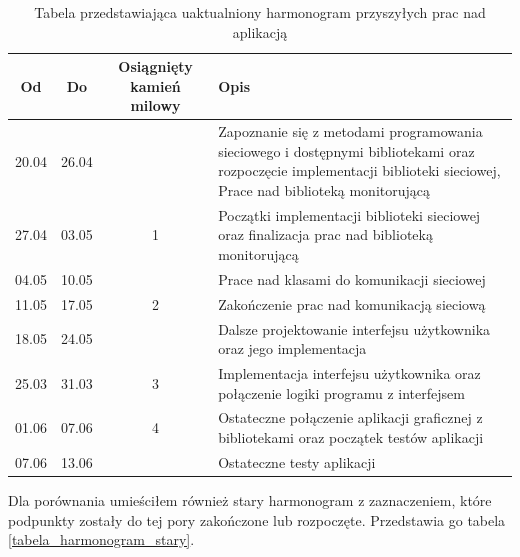 \documentclass[a4paper]{article}
\begin{document}
\begin{table}[h]
			\centering
			\begin{tabularx}{\linewidth}{|c|c|c|X|}
				\hline
				Od & Do & Osiągnięty kamień milowy & Opis \\ \hline
				20.04 & 26.04 &  & Zapoznanie się z metodami programowania sieciowego i dostępnymi bibliotekami oraz  rozpoczęcie implementacji biblioteki sieciowej, Prace nad biblioteką monitorującą\\ \hline
				27.04 & 03.05 & 1 & Początki implementacji biblioteki sieciowej oraz finalizacja prac nad biblioteką monitorującą \\ \hline
				04.05 & 10.05 &  & Prace nad klasami do komunikacji sieciowej \\ \hline
				11.05 & 17.05 & 2  & Zakończenie prac nad komunikacją sieciową  \\ \hline
				18.05 & 24.05 &  & Dalsze projektowanie interfejsu użytkownika oraz jego implementacja \\ \hline
				25.03 & 31.03 & 3 & Implementacja interfejsu użytkownika oraz połączenie logiki programu z interfejsem \\ \hline
				01.06 & 07.06 & 4 & Ostateczne połączenie aplikacji graficznej z bibliotekami oraz początek testów aplikacji \\ \hline
				07.06 & 13.06 &  & Ostateczne testy aplikacji \\ \hline
			\end{tabularx}
			\caption{Tabela przedstawiająca uaktualniony harmonogram przyszyłych prac nad aplikacją}
			\label{tabela_harmonogram}
		\end{table}
Dla porównania umieściłem również stary harmonogram z zaznaczeniem, które podpunkty zostały do tej pory zakończone lub rozpoczęte. Przedstawia go tabela \ref{tabela_harmonogram_stary}.
\end{document}

